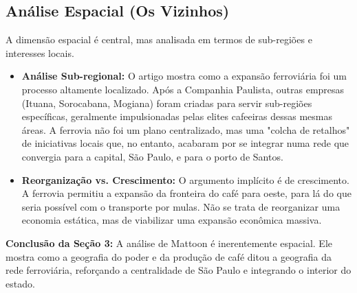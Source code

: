 \documentclass[12pt, a4paper]{article}
\begin{document}
\subsection{Análise Espacial (Os Vizinhos)}
A dimensão espacial é central, mas analisada em termos de sub-regiões e interesses locais.
\begin{itemize}
    \item \textbf{Análise Sub-regional:} O artigo mostra como a expansão ferroviária foi um processo altamente localizado. Após a Companhia Paulista, outras empresas (Ituana, Sorocabana, Mogiana) foram criadas para servir sub-regiões específicas, geralmente impulsionadas pelas elites cafeeiras dessas mesmas áreas. A ferrovia não foi um plano centralizado, mas uma "colcha de retalhos" de iniciativas locais que, no entanto, acabaram por se integrar numa rede que convergia para a capital, São Paulo, e para o porto de Santos.
    \item \textbf{Reorganização vs. Crescimento:} O argumento implícito é de crescimento. A ferrovia permitiu a expansão da fronteira do café para oeste, para lá do que seria possível com o transporte por mulas. Não se trata de reorganizar uma economia estática, mas de viabilizar uma expansão econômica massiva.
\end{itemize}

\noindent\textbf{Conclusão da Seção 3:} A análise de Mattoon é inerentemente espacial. Ele mostra como a geografia do poder e da produção de café ditou a geografia da rede ferroviária, reforçando a centralidade de São Paulo e integrando o interior do estado.
\end{document}
